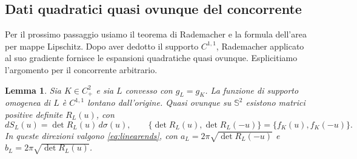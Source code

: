 \documentclass[11pt,a4paper]{article}
\newtheorem{lemma}[theorem]{Lemma}
\theoremstyle{remark}
\newcommand{\Sph}{\mathbb S^2}
\begin{document}
\subsection*{Dati quadratici quasi ovunque del concorrente}
Per il prossimo passaggio usiamo il teorema di Rademacher e la formula
dell'area per mappe Lipschitz. Dopo aver dedotto il supporto $C^{1,1}$,
Rademacher applicato al suo gradiente fornisce le espansioni quadratiche
quasi ovunque. Esplicitiamo l'argomento per il concorrente arbitrario.

\begin{lemma}\label{lem:roughcompetitor}
Sia $K\in C^2_+$ e sia $L$ convesso con $g_L=g_K$. La funzione di
supporto omogenea di $L$ è $C^{1,1}$ lontano dall'origine. Quasi ovunque
su $\Sph$ esistono matrici positive definite $R_L(u)$, con
\[
dS_L(u)=\det R_L(u)\,d\sigma(u),\qquad
\{\det R_L(u),\det R_L(-u)\}=
\{f_K(u),f_K(-u)\}.
\]
In queste direzioni valgono \eqref{eq:linearends}, con
$a_L=2\pi\sqrt{\det R_L(-u)}$ e
$b_L=2\pi\sqrt{\det R_L(u)}$.
\end{lemma}
\end{document}

